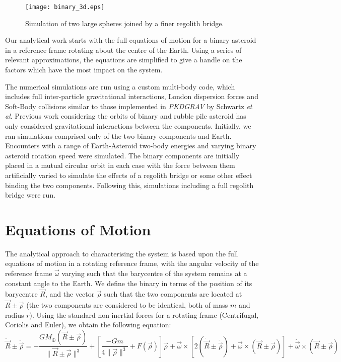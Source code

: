 \documentclass[letterpaper, preprint, paper,11pt]{AAS}	%
\begin{document}
\begin{figure}[H]
\centering
\texttt{[image: binary\_3d.eps]} 
\caption{Simulation of two large spheres joined by a finer regolith bridge.} 
\label{fig:Pic}
\end{figure} 

Our analytical work starts with the full equations of motion for a binary asteroid in a reference frame rotating about the centre of the Earth. Using a series of relevant approximations, the equations are simplified to give a handle on the factors which have the most impact on the system. 

The numerical simulations are run using a custom multi-body code, which includes full inter-particle gravitational interactions, London dispersion forces and Soft-Body collisions similar to those implemented in \textit{PKDGRAV} by Schwartz \textit{et al}\cite{soft}.
Previous work considering the orbits of binary and rubble pile asteroid has only considered gravitational interactions between the components. 
Initially, we ran simulations comprised only of the two binary components and Earth. Encounters with a range of Earth-Asteroid two-body energies and varying binary asteroid rotation speed were simulated. The binary components are initially placed in a mutual circular orbit in each case with the force between them artificially varied to simulate the effects of a regolith bridge or some other effect binding the two components. Following this, simulations including a full regolith bridge were run.



\section{Equations of Motion}

The analytical approach to characterising the system is based upon the full equations of motion in a rotating reference frame, with the angular velocity of the reference frame $\vec{\omega}$ varying such that the barycentre of the system remains at a constant angle to the Earth. We define the binary in terms of the position of its barycentre $\vec{R}$, and the vector $\vec{\rho}$ such that the two components are located at $\vec{R}\pm\vec{\rho}$ (the two components are considered to be identical, both of mass $m$ and radius $r$). Using the standard non-inertial forces for a rotating frame (Centrifugal, Coriolis and Euler), we obtain the following equation:
\begin{equation}
\ddot{\vec{R}}\pm\ddot{\vec{\rho}} = -\frac{GM_\oplus(\vec{R}\pm\vec{\rho})}{\|\vec{R}\pm\vec{\rho}\|^{3}} + \left[\frac{-Gm}{4\|\vec{\rho}\|^{3}}+F(\vec{\rho})\right]\vec{\rho} +  \vec{\omega}\times[2(\dot{\vec{R}}\pm\dot{\vec{\rho}}) + \vec{\omega}\times(\vec{R}\pm\vec{\rho})]+\dot{\vec{\omega}}\times(\vec{R}\pm\vec{\rho}) 
\end{equation}
\end{document}
